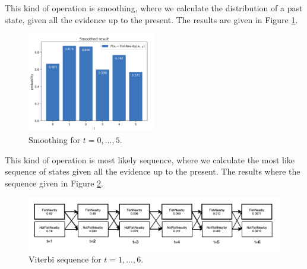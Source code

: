 \documentclass[11pt, a4paper, english]{NTNUoving}
\begin{document}
\begin{oppgave}
\begin{punkt}
    This kind of operation is smoothing, where we calculate the distribution of a past state, given all the evidence up to the present.
    The results are given in Figure \ref{fig:smoothing}.

    \begin{figure}[H]
        \centering
        \includegraphics[width=0.5\textwidth]{smoothing.png}
        \caption{Smoothing for $t = 0,...,5$.}
        \label{fig:smoothing}
    \end{figure}
\end{punkt}

\begin{punkt}
    This kind of operation is most likely sequence, where we calculate the most like sequence of states given all the evidence up to the present.
    The results where the sequence given in Figure \ref{fig:viterbi}.

    \begin{figure}[H]
        \centering
        \includegraphics[width=1.0\textwidth]{viterbi.png}
        \caption{Viterbi sequence for $t = 1,...,6$.}
        \label{fig:viterbi}
    \end{figure}
\end{punkt}

\end{oppgave}
\end{document}
